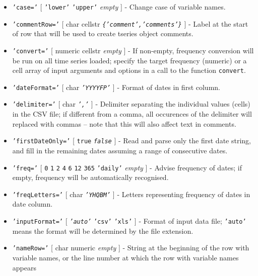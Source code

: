 \begin{itemize}
\item
  \texttt{'case='} {[} \texttt{'lower'} \textbar{} \texttt{'upper'}
  \textbar{} \emph{empty} {]} - Change case of variable names.
\item
  \texttt{'commentRow='} {[} char \textbar{} cellstr \textbar{}
  \emph{\texttt{\{'comment','comments'\}}} {]} - Label at the start of
  row that will be used to create tseries object comments.
\item
  \texttt{'convert='} {[} numeric \textbar{} cellstr \textbar{}
  \emph{empty} {]} - If non-empty, frequency conversion will be run on
  all time series loaded; specify the target frequency (numeric) or a
  cell array of input arguments and options in a call to the function
  \texttt{convert}.
\item
  \texttt{'dateFormat='} {[} char \textbar{} \emph{\texttt{'YYYYFP'}}
  {]} - Format of dates in first column.
\item
  \texttt{'delimiter='} {[} char \textbar{} \emph{\texttt{','}} {]} -
  Delimiter separating the individual values (cells) in the CSV file; if
  different from a comma, all occurences of the delimiter will replaced
  with commas -- note that this will also affect text in comments.
\item
  \texttt{'firstDateOnly='} {[} \texttt{true} \textbar{}
  \emph{\texttt{false}} {]} - Read and parse only the first date string,
  and fill in the remaining dates assuming a range of consecutive dates.
\item
  \texttt{'freq='} {[} \texttt{0} \textbar{} \texttt{1} \textbar{}
  \texttt{2} \textbar{} \texttt{4} \textbar{} \texttt{6} \textbar{}
  \texttt{12} \textbar{} \texttt{365} \textbar{} \texttt{'daily'}
  \textbar{} \emph{empty} {]} - Advise frequency of dates; if empty,
  frequency will be automatically recognised.
\item
  \texttt{'freqLetters='} {[} char \textbar{} \emph{\texttt{'YHQBM'}}
  {]} - Letters representing frequency of dates in date column.
\item
  \texttt{'inputFormat='} {[} \emph{\texttt{'auto'}} \textbar{}
  \texttt{'csv'} \textbar{} \texttt{'xls'} {]} - Format of input data
  file; \texttt{'auto'} means the format will be determined by the file
  extension.
\item
  \texttt{'nameRow='} {[} char \textbar{} numeric \textbar{}
  \emph{empty} {]} - String at the beginning of the row with variable
  names, or the line number at which the row with variable names appears

\end{itemize}
